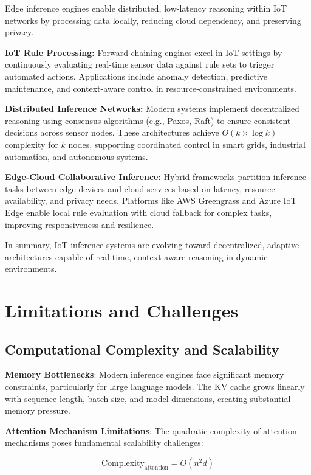 \documentclass[12pt,a4paper]{article}
\begin{document}
Edge inference engines enable distributed, low-latency reasoning within IoT networks by processing data locally, reducing cloud dependency, and preserving privacy.

\textbf{IoT Rule Processing:}  
Forward-chaining engines excel in IoT settings by continuously evaluating real-time sensor data against rule sets to trigger automated actions. Applications include anomaly detection, predictive maintenance, and context-aware control in resource-constrained environments.

\textbf{Distributed Inference Networks:}  
Modern systems implement decentralized reasoning using consensus algorithms (e.g., Paxos, Raft) to ensure consistent decisions across sensor nodes. These architectures achieve $O(k \times \log k)$ complexity for $k$ nodes, supporting coordinated control in smart grids, industrial automation, and autonomous systems.

\textbf{Edge-Cloud Collaborative Inference:}  
Hybrid frameworks partition inference tasks between edge devices and cloud services based on latency, resource availability, and privacy needs. Platforms like AWS Greengrass and Azure IoT Edge enable local rule evaluation with cloud fallback for complex tasks, improving responsiveness and resilience.

In summary, IoT inference systems are evolving toward decentralized, adaptive architectures capable of real-time, context-aware reasoning in dynamic environments.


\section{Limitations and Challenges}
\subsection{Computational Complexity and Scalability}
\textbf{Memory Bottlenecks}: Modern inference engines face significant memory constraints, particularly for large language models. The KV cache grows linearly with sequence length, batch size, and model dimensions, creating substantial memory pressure.

\textbf{Attention Mechanism Limitations}: The quadratic complexity of attention mechanisms poses fundamental scalability challenges:

\begin{equation}
\text{Complexity}_{\text{attention}} = O(n^2 d)
\end{equation}
\end{document}
